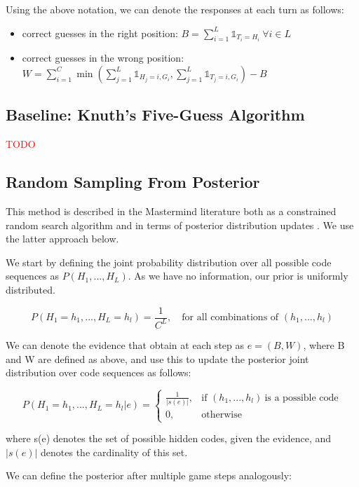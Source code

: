 \documentclass[11pt]{article}
\begin{document}
\noindent Using the above notation, we can denote the responses at each turn as follows:

\begin{itemize}
\item correct guesses in the right position: $B = \sum_{i=1}^L \mathbb{1}_{T_i=H_i} \ \forall i \in L$
\item correct guesses in the wrong position: $W = \sum_{i=1}^{C} \min(\sum_{j=1}^{L}\mathbb{1}_{H_j=i, G_i}, \sum_{j=1}^{L}\mathbb{1}_{T_j=i, G_i}) - B$
\end{itemize}

\subsection{Baseline: Knuth's Five-Guess Algorithm}

\noindent \textcolor{red}{TODO}

\subsection{Random Sampling From Posterior}

This method is described in the Mastermind literature both as a constrained random search algorithm \cite{bernier1996solving} and in terms of posterior distribution updates \cite{vomlel2004bayesian}. We use the latter approach below.

We start by defining the joint probability distribution over all possible code sequences as $P(H_1, ..., H_L)$. As we have no information, our prior is uniformly distributed.

\[
P(H_1=h_1, ..., H_L=h_l) = \frac{1}{C^L} ,\quad \text{for all combinations of }(h_1, ..., h_l)
\]

\noindent We can denote the evidence that obtain at each step as $e = (B, W)$, where B and W are defined as above, and use this to update the posterior joint distribution over code sequences as follows:

\[
    P(H_1=h_1, ..., H_L=h_l | e) = 
\begin{cases}
    \frac{1}{|s(e)|},& \text{if } (h_1, ..., h_l) \ \text{is a possible code}\\
    0,              & \text{otherwise}
\end{cases}
\]

\noindent where s(e) denotes the set of possible hidden codes, given the evidence, and $|s(e)|$ denotes the cardinality of this set. \medskip

\noindent We can define the posterior after multiple game steps analogously:
\end{document}
